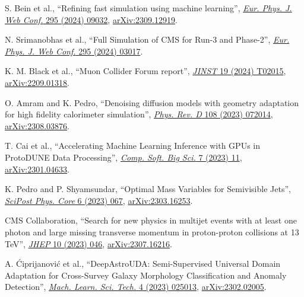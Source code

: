 \begin{description}[leftmargin=12pt,font=\normalfont,labelsep=0em]
\item \begin{sloppypar}S. Bein et al., ``Refining fast simulation using machine learning'', \href{https://doi.org/10.1051/epjconf/202429509032}{\emph{Eur. Phys. J. Web Conf.} 295 (2024) 09032}, \href{https://arxiv.org/abs/2309.12919}{arXiv:2309.12919}.\end{sloppypar} %
\item N. Srimanobhas et al., ``Full Simulation of CMS for Run-3 and Phase-2'', \href{https://doi.org/10.1051/epjconf/202429503017}{\emph{Eur. Phys. J. Web Conf.} 295 (2024) 03017}. %
\item K. M. Black et al., ``Muon Collider Forum report'', \href{https://doi.org/10.1088/1748-0221/19/02/T02015}{\emph{JINST} 19 (2024) T02015}, \href{https://arxiv.org/abs/2209.01318}{arXiv:2209.01318}. %
\item O. Amram and K. Pedro, ``Denoising diffusion models with geometry adaptation for high fidelity calorimeter simulation'', \href{https://doi.org/10.1103/PhysRevD.108.072014}{\emph{Phys. Rev. D} 108 (2023) 072014}, \href{https://arxiv.org/abs/2308.03876}{arXiv:2308.03876}. %
\item T. Cai et al., ``Accelerating Machine Learning Inference with GPUs in ProtoDUNE Data Processing'', \href{https://doi.org/10.1007/s41781-023-00101-0}{\emph{Comp. Soft. Big Sci.} 7 (2023) 11}, \href{https://arxiv.org/abs/2301.04633}{arXiv:2301.04633}. %
\item \begin{sloppypar}K. Pedro and P. Shyamsundar, ``Optimal Mass Variables for Semivisible Jets'', \href{https://doi.org/10.21468/SciPostPhysCore.6.4.067}{\emph{SciPost Phys. Core} 6 (2023) 067}, \href{https://arxiv.org/abs/2303.16253}{arXiv:2303.16253}.\end{sloppypar} %
\item CMS Collaboration, ``Search for new physics in multijet events with at least one photon and large missing transverse momentum in proton-proton collisions at 13 TeV'', \href{https://doi.org/10.1007/JHEP10(2023)046}{\emph{JHEP} 10 (2023) 046}, \href{https://arxiv.org/abs/2307.16216}{arXiv:2307.16216}. %
\item A. \'Ciprijanovi\'c et al., ``DeepAstroUDA: Semi-Supervised Universal Domain Adaptation for Cross-Survey Galaxy Morphology Classification and Anomaly Detection'', \href{https://doi.org/10.1088/2632-2153/acca5f}{\emph{Mach. Learn. Sci. Tech.} 4 (2023) 025013}, \href{https://arxiv.org/abs/2302.02005}{arXiv:2302.02005}. %

\end{description}
